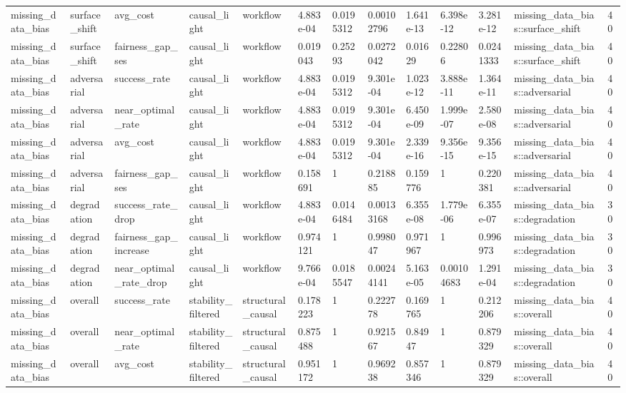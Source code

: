 \begin{tabular}{lllllllllllll}
missing\_data\_bias & surface\_shift & avg\_cost & causal\_light & workflow & 4.883e-04 & 0.0195312 & 0.00102796 & 1.641e-13 & 6.398e-12 & 3.281e-12 & missing\_data\_bias::surface\_shift & 40 \\
missing\_data\_bias & surface\_shift & fairness\_gap\_ses & causal\_light & workflow & 0.019043 & 0.25293 & 0.0272042 & 0.01629 & 0.22806 & 0.0241333 & missing\_data\_bias::surface\_shift & 40 \\
missing\_data\_bias & adversarial & success\_rate & causal\_light & workflow & 4.883e-04 & 0.0195312 & 9.301e-04 & 1.023e-12 & 3.888e-11 & 1.364e-11 & missing\_data\_bias::adversarial & 40 \\
missing\_data\_bias & adversarial & near\_optimal\_rate & causal\_light & workflow & 4.883e-04 & 0.0195312 & 9.301e-04 & 6.450e-09 & 1.999e-07 & 2.580e-08 & missing\_data\_bias::adversarial & 40 \\
missing\_data\_bias & adversarial & avg\_cost & causal\_light & workflow & 4.883e-04 & 0.0195312 & 9.301e-04 & 2.339e-16 & 9.356e-15 & 9.356e-15 & missing\_data\_bias::adversarial & 40 \\
missing\_data\_bias & adversarial & fairness\_gap\_ses & causal\_light & workflow & 0.158691 & 1 & 0.218885 & 0.159776 & 1 & 0.220381 & missing\_data\_bias::adversarial & 40 \\
missing\_data\_bias & degradation & success\_rate\_drop & causal\_light & workflow & 4.883e-04 & 0.0146484 & 0.00133168 & 6.355e-08 & 1.779e-06 & 6.355e-07 & missing\_data\_bias::degradation & 30 \\
missing\_data\_bias & degradation & fairness\_gap\_increase & causal\_light & workflow & 0.974121 & 1 & 0.998047 & 0.971967 & 1 & 0.996973 & missing\_data\_bias::degradation & 30 \\
missing\_data\_bias & degradation & near\_optimal\_rate\_drop & causal\_light & workflow & 9.766e-04 & 0.0185547 & 0.00244141 & 5.163e-05 & 0.00104683 & 1.291e-04 & missing\_data\_bias::degradation & 30 \\
missing\_data\_bias & overall & success\_rate & stability\_filtered & structural\_causal & 0.178223 & 1 & 0.222778 & 0.169765 & 1 & 0.212206 & missing\_data\_bias::overall & 40 \\
missing\_data\_bias & overall & near\_optimal\_rate & stability\_filtered & structural\_causal & 0.875488 & 1 & 0.921567 & 0.84947 & 1 & 0.879329 & missing\_data\_bias::overall & 40 \\
missing\_data\_bias & overall & avg\_cost & stability\_filtered & structural\_causal & 0.951172 & 1 & 0.969238 & 0.857346 & 1 & 0.879329 & missing\_data\_bias::overall & 40 \\

\end{tabular}
